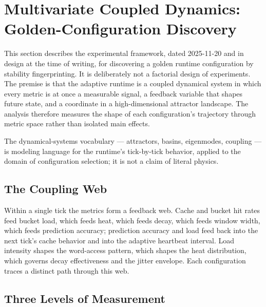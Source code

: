 
\section{Multivariate Coupled Dynamics: Golden-Configuration Discovery}

This section describes the experimental framework, dated 2025-11-20 and in
design at the time of writing, for discovering a golden runtime configuration by
stability fingerprinting. It is deliberately not a factorial design of
experiments. The premise is that the adaptive runtime is a coupled dynamical
system in which every metric is at once a measurable signal, a feedback variable
that shapes future state, and a coordinate in a high-dimensional attractor
landscape. The analysis therefore measures the shape of each configuration's
trajectory through metric space rather than isolated main effects.

The dynamical-systems vocabulary --- attractors, basins, eigenmodes, coupling
--- is modeling language for the runtime's tick-by-tick behavior, applied to the
domain of configuration selection; it is not a claim of literal physics.

\subsection{The Coupling Web}

Within a single tick the metrics form a feedback web. Cache and bucket hit rates
feed bucket load, which feeds heat, which feeds decay, which feeds window width,
which feeds prediction accuracy; prediction accuracy and load feed back into the
next tick's cache behavior and into the adaptive heartbeat interval. Load
intensity shapes the word-access pattern, which shapes the heat distribution,
which governs decay effectiveness and the jitter envelope. Each configuration
traces a distinct path through this web.

\subsection{Three Levels of Measurement}

